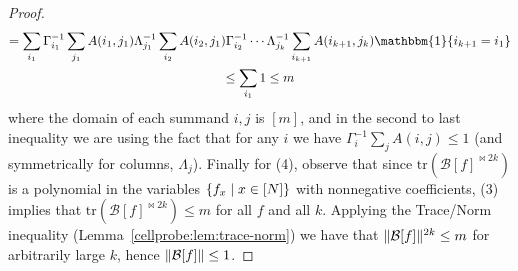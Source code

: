 \begin{proof}
\begin{gather*}
 = \sum_{i_1} \Gamma_{i_1}^{-1} \sum_{j_1} A(i_1,j_1) \Lambda_{j_1}^{-1} \sum_{i_2} A(i_2,j_1)  \Gamma_{i_2}^{-1} \cdots \Lambda_{j_k}^{-1}\sum_{i_{k+1}}A(i_{k+1},j_k) \mathbbm{1}\{i_{k+1} = i_1\}\\
 \leq \sum_{i_1} 1 \leq m
\end{gather*}
where the domain of each summand $i,j$ is $[m]$, and in the second to last inequality we are using the fact that for any $i$ we have $\Gamma_i^{-1} \sum_{j} A(i,j) \leq 1$ (and symmetrically for columns, $\Lambda_j$). Finally for (4), observe that since $\mathrm{tr}(\mathcal{B}[f]^{\bowtie 2k})$ is a polynomial in the variables $\{f_x \mid x \in [N]\}$ with nonnegative coefficients, (3) implies that $\mathrm{tr}(\mathcal{B}[f]^{\bowtie 2k}) \leq m$ for all $f$ and all $k$. Applying the Trace/Norm inequality (Lemma~\ref{cellprobe:lem:trace-norm}) we have that $\Vert \mathcal{B}[f] \Vert^{2k} \leq m$ for arbitrarily large $k$, hence $\Vert \mathcal{B}[f] \Vert \leq 1$.
\end{proof}

